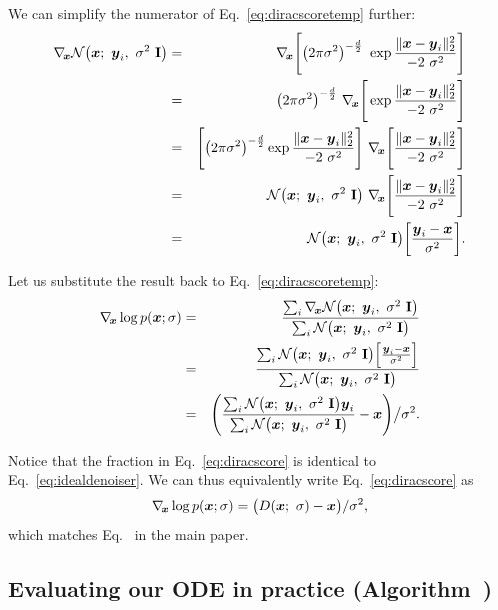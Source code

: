 We can simplify the numerator of Eq.~\ref{eq:diracscoretemp} further:
\begin{eqnarray}
  \nabla_{\hspace{-0.5mm}\boldsymbol{x}} \mathcal{N} \big( \boldsymbol{x}; ~\boldsymbol{y}_i, ~\sigma^2 ~\mathbf{I} \big) &=& \nabla_{\hspace{-0.5mm}\boldsymbol{x}} \Bigg[ \big( 2 \pi \sigma^2 \big)^{-\frac{d}{2}} ~\exp \frac{\lVert \boldsymbol{x} - \boldsymbol{y}_i \rVert_2^2}{-2 ~\sigma^2} \Bigg] \\
  &=& \big( 2 \pi \sigma^2 \big)^{-\frac{d}{2}} ~\nabla_{\hspace{-0.5mm}\boldsymbol{x}} \Bigg[ \exp \frac{\lVert \boldsymbol{x} - \boldsymbol{y}_i \rVert_2^2}{-2 ~\sigma^2} \Bigg] \\
  &=& \Bigg[\big( 2 \pi \sigma^2 \big)^{-\frac{d}{2}} \exp \frac{\lVert \boldsymbol{x} - \boldsymbol{y}_i \rVert_2^2}{-2 ~\sigma^2} \Bigg] ~\nabla_{\hspace{-0.5mm}\boldsymbol{x}} \Bigg[ \frac{\lVert \boldsymbol{x} - \boldsymbol{y}_i \rVert_2^2}{-2 ~\sigma^2} \Bigg] \\
  &=& \mathcal{N} \big( \boldsymbol{x}; ~\boldsymbol{y}_i, ~\sigma^2 ~\mathbf{I} \big) ~\nabla_{\hspace{-0.5mm}\boldsymbol{x}} \Bigg[ \frac{\lVert \boldsymbol{x} - \boldsymbol{y}_i \rVert_2^2}{-2 ~\sigma^2} \Bigg] \\
  &=& \mathcal{N} \big( \boldsymbol{x}; ~\boldsymbol{y}_i, ~\sigma^2 ~\mathbf{I} \big) \bigg[ \frac{\boldsymbol{y}_i - \boldsymbol{x}}{\sigma^2} \bigg]
  \text{.}
\end{eqnarray}

Let us substitute the result back to Eq.~\ref{eq:diracscoretemp}:
\begin{eqnarray}
  \nabla_{\hspace{-0.5mm}\boldsymbol{x}} \log p(\boldsymbol{x}; \sigma) &=& \frac{ \sum_i \nabla_{\hspace{-0.5mm}\boldsymbol{x}} \mathcal{N} \big( \boldsymbol{x}; ~\boldsymbol{y}_i, ~\sigma^2 ~\mathbf{I} \big) }{ \sum_i \mathcal{N} \big( \boldsymbol{x}; ~\boldsymbol{y}_i, ~\sigma^2 ~\mathbf{I} \big) } \\
  &=& \frac{ \sum_i \mathcal{N} \big( \boldsymbol{x}; ~\boldsymbol{y}_i, ~\sigma^2 ~\mathbf{I} \big) \Big[ \frac{\boldsymbol{y}_i - \boldsymbol{x}}{\sigma^2} \Big] }{ \sum_i \mathcal{N} \big( \boldsymbol{x}; ~\boldsymbol{y}_i, ~\sigma^2 ~\mathbf{I} \big) } \\
  &=& \Bigg( \frac{ \sum_i \mathcal{N} \big( \boldsymbol{x}; ~\boldsymbol{y}_i, ~\sigma^2 ~\mathbf{I} \big) \boldsymbol{y}_i }{ \sum_i \mathcal{N} \big( \boldsymbol{x}; ~\boldsymbol{y}_i, ~\sigma^2 ~\mathbf{I} \big) } - \boldsymbol{x} \Bigg) \big/ \sigma^2
  \label{eq:diracscore}
  \text{.}
\end{eqnarray}

Notice that the fraction in Eq.~\ref{eq:diracscore} is identical to Eq.~\ref{eq:idealdenoiser}.
We can thus equivalently write Eq.~\ref{eq:diracscore} as
\begin{equation}
  \nabla_{\hspace{-0.5mm}\boldsymbol{x}} \log p(\boldsymbol{x}; \sigma) = \big( D(\boldsymbol{x}; ~\sigma) - \boldsymbol{x} \big) / \sigma^2
  \text{,}
\end{equation}
which matches Eq.~ in the main paper.

\subsection{Evaluating our ODE in practice (Algorithm~)}
\label{app:odeinpractice}

